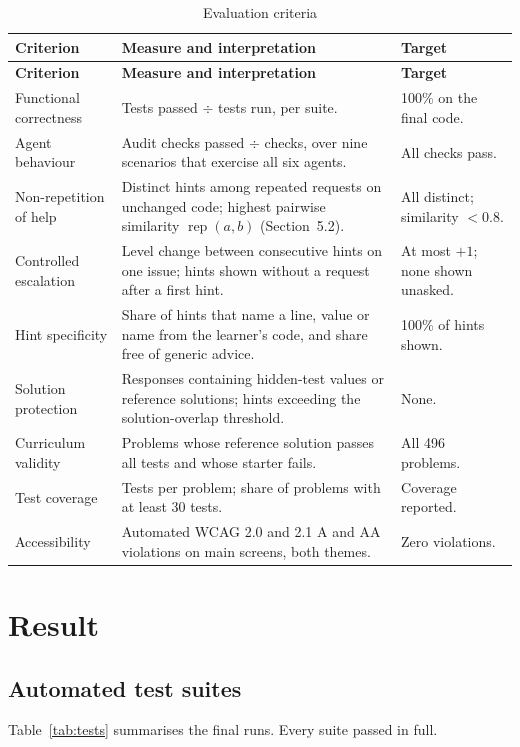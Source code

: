 \begingroup\small
\setlength{\tabcolsep}{4pt}\renewcommand{\arraystretch}{1.15}
\begin{longtable}{|R{3.4cm}|R{6.6cm}|R{3.6cm}|}
\caption{Evaluation criteria}\label{tab:criteria}\\\hline
\textbf{Criterion} & \textbf{Measure and interpretation} & \textbf{Target}\\\hline\endfirsthead
\hline\textbf{Criterion} & \textbf{Measure and interpretation} & \textbf{Target}\\\hline\endhead
Functional correctness & Tests passed $\div$ tests run, per suite. & 100\% on the final code.\\\hline
Agent behaviour & Audit checks passed $\div$ checks, over nine scenarios that exercise all six agents. & All checks pass.\\\hline
Non-repetition of help & Distinct hints among repeated requests on unchanged code; highest pairwise similarity $\operatorname{rep}(a,b)$ (Section~5.2). & All distinct; similarity $<0.8$.\\\hline
Controlled escalation & Level change between consecutive hints on one issue; hints shown without a request after a first hint. & At most $+1$; none shown unasked.\\\hline
Hint specificity & Share of hints that name a line, value or name from the learner's code, and share free of generic advice. & 100\% of hints shown.\\\hline
Solution protection & Responses containing hidden-test values or reference solutions; hints exceeding the solution-overlap threshold. & None.\\\hline
Curriculum validity & Problems whose reference solution passes all tests and whose starter fails. & All 496 problems.\\\hline
Test coverage & Tests per problem; share of problems with at least 30 tests. & Coverage reported.\\\hline
Accessibility & Automated WCAG 2.0 and 2.1 A and AA violations on main screens, both themes. & Zero violations.\\\hline
\end{longtable}
\endgroup

\section{Result}
\subsection{Automated test suites}
Table~\ref{tab:tests} summarises the final runs. Every suite passed in full.

